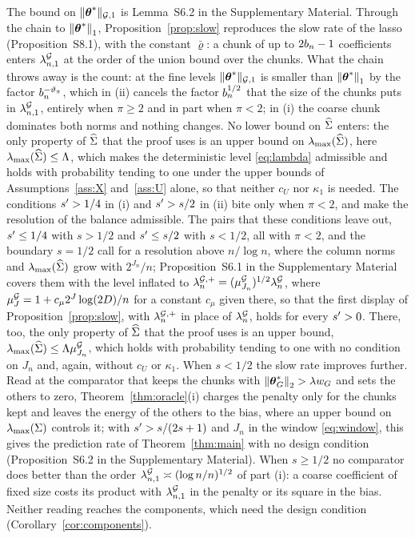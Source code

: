 The bound on $\lVert \boldsymbol{\theta}^{*}\rVert_{\mathcal{G},1}$ is Lemma~S6.2 in the
Supplementary Material. Through the chain to $\left\lVert \boldsymbol{\theta}^{*} \right\rVert_{1}$,
Proposition~\ref{prop:slow} reproduces the slow rate of the lasso
(Proposition~S8.1), with the constant $\bar\varrho$: a chunk of up to $2b_{n}-1$
coefficients enters $\lambda^{\mathcal{G}}_{n,1}$ at the order of the union bound over the chunks.
What the chain throws away is the count: at the fine levels
$\lVert \boldsymbol{\theta}^{*}\rVert_{\mathcal{G},1}$ is smaller than $\left\lVert \boldsymbol{\theta}^{*} \right\rVert_{1}$ by the factor
$b_{n}^{-\vartheta_\pi}$, which in (ii) cancels the factor $b_{n}^{1/2}$ that the
size of the chunks puts in $\lambda^{\mathcal{G}}_{n,1}$, entirely when $\pi \ge 2$ and in part
when $\pi < 2$; in (i) the coarse chunk dominates both norms and nothing
changes. No lower bound on $\widehat{\Sigma}$ enters: the only property of $\widehat{\Sigma}$
that the proof uses is  an upper bound on
$\lambda_{\max}(\widehat{\Sigma})$, here $\lambda_{\max}(\widehat{\Sigma}) \le \Lambda$, which makes the
deterministic level \eqref{eq:lambda} admissible and holds with probability
tending to one under the upper bounds of Assumptions~\ref{ass:X}
and~\ref{ass:U} alone, so that neither $c_U$ nor $\kappa_1$ is needed. The
conditions $s' > 1/4$ in (i) and $s' > s/2$ in (ii) bite only when
$\pi < 2$, and make the resolution of the balance admissible.
The pairs that these conditions leave out, $s' \le 1/4$ with $s > 1/2$ and
$s' \le s/2$ with $s < 1/2$, all with $\pi < 2$, and the boundary $s = 1/2$
call for a resolution above $n/\log n$, where the column norms and
$\lambda_{\max}(\widehat{\Sigma})$ grow with $2^{J_n}/n$; Proposition~S6.1 in the
Supplementary Material covers them with the level inflated to
$\lambda^{\mathcal{G},+}_{n} = (\mu^{\mathcal{G}}_{J_n})^{1/2}\lambda^{\mathcal{G}}_{n}$, where
$\mu^{\mathcal{G}}_{J} = 1 + c_{\mu}2^{J}\log(2D)/n$ for a constant $c_{\mu}$ given
there, so that the first display of Proposition~\ref{prop:slow}, with $\lambda^{\mathcal{G},+}_{n}$
in place of $\lambda^{\mathcal{G}}_{n}$, holds for every $s' > 0$. There, too, the only
property of $\widehat{\Sigma}$ that the proof uses is an upper bound,
$\lambda_{\max}(\widehat{\Sigma}) \le \Lambda\mu^{\mathcal{G}}_{J_n}$, which holds with probability
tending to one with no condition on $J_n$ and, again, without $c_U$ or
$\kappa_1$.
When $s < 1/2$ the slow rate improves further. Read at the comparator that
keeps the chunks with $\left\lVert \boldsymbol{\theta}^{*}_{G} \right\rVert_{2} > \lambda w_{G}$ and sets the
others to zero, Theorem~\ref{thm:oracle}(i) charges the penalty only for the
chunks kept and leaves the energy of the others to the bias, where an upper
bound on $\lambda_{\max}(\Sigma)$ controls it; with $s' > s/(2s+1)$ and $J_n$ in the
window \eqref{eq:window}, this gives the prediction rate of
Theorem~\ref{thm:main} with no design condition (Proposition~S6.2 in the
Supplementary Material). When $s \ge 1/2$ no comparator does better than the
order $\lambda^{\mathcal{G}}_{n,1} \asymp (\log n/n)^{1/2}$ of part (i): a coarse coefficient of
fixed size costs its product with $\lambda^{\mathcal{G}}_{n,1}$ in the penalty or its square in
the bias. Neither reading reaches the components, which need the design
condition (Corollary~\ref{cor:components}).

